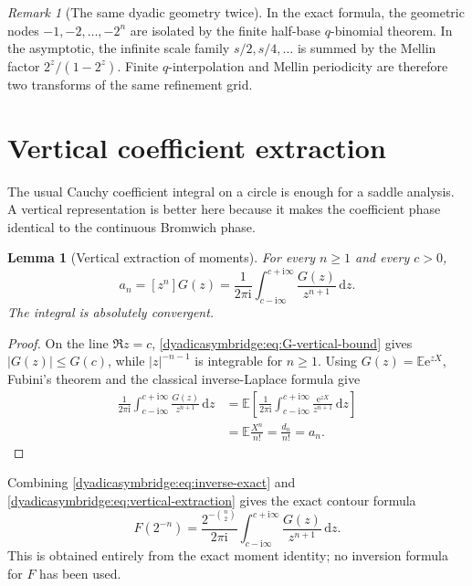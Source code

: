 \documentclass[11pt,oneside]{article}
\newtheorem{lemma}[theorem]{Lemma}
\theoremstyle{definition}
\theoremstyle{remark}
\newtheorem{remark}[theorem]{Remark}
\newcommand{\e}{\mathrm e}
\newcommand{\ii}{\mathrm i}
\newcommand{\dd}{\,\mathrm d}
\newcommand{\E}{\mathbb E}
\begin{document}
\begin{remark}[The same dyadic geometry twice]
In the exact formula, the geometric nodes $-1,-2,\ldots,-2^n$ are isolated by the finite half-base $q$-binomial theorem.  In the asymptotic, the infinite scale family $s/2,s/4,\ldots$ is summed by the Mellin factor $2^z/(1-2^z)$.  Finite $q$-interpolation and Mellin periodicity are therefore two transforms of the same refinement grid.
\end{remark}

\section{Vertical coefficient extraction}
\label{dyadicasymbridge:sec:vertical-coeff}

The usual Cauchy coefficient integral on a circle is enough for a saddle analysis.  A vertical representation is better here because it makes the coefficient phase identical to the continuous Bromwich phase.

\begin{lemma}[Vertical extraction of moments]
\label{dyadicasymbridge:lem:vertical-extraction}
For every $n\ge1$ and every $c>0$,
\begin{equation}
 a_n=[z^n]G(z)=
 \frac1{2\pi\ii}
 \int_{c-\ii\infty}^{c+\ii\infty}
 \frac{G(z)}{z^{n+1}}\dd z.
\label{dyadicasymbridge:eq:vertical-extraction}
\end{equation}
The integral is absolutely convergent.
\end{lemma}

\begin{proof}
On the line $\Re z=c$, \eqref{dyadicasymbridge:eq:G-vertical-bound} gives
$|G(z)|\le G(c)$, while $|z|^{-n-1}$ is integrable for $n\ge1$.
Using $G(z)=\E\e^{zX}$, Fubini's theorem and the classical inverse-Laplace formula give
\begin{align*}
 \frac1{2\pi\ii}\int_{c-\ii\infty}^{c+\ii\infty}
 \frac{G(z)}{z^{n+1}}\dd z
 &=\E\left[
 \frac1{2\pi\ii}\int_{c-\ii\infty}^{c+\ii\infty}
 \frac{\e^{zX}}{z^{n+1}}\dd z\right]\\
 &=\E\frac{X^n}{n!}=\frac{d_n}{n!}=a_n.
\end{align*}
\end{proof}

Combining \eqref{dyadicasymbridge:eq:inverse-exact} and \eqref{dyadicasymbridge:eq:vertical-extraction} gives the exact contour formula
\begin{equation}
 F(2^{-n})=
 \frac{2^{-\binom n2}}{2\pi\ii}
 \int_{c-\ii\infty}^{c+\ii\infty}
 \frac{G(z)}{z^{n+1}}\dd z.
\label{dyadicasymbridge:eq:inverse-vertical}
\end{equation}
This is obtained entirely from the exact moment identity; no inversion formula for $F$ has been used.
\end{document}
